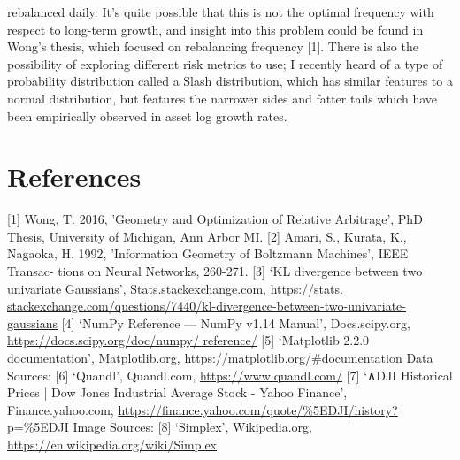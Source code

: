 \documentclass{article}
\begin{document}
rebalanced daily. It’s quite possible that this is not the optimal frequency with respect to long-term growth, and insight into this problem could be found in Wong’s thesis, which focused on rebalancing frequency [1].
There is also the possibility of exploring different risk metrics to use; I recently heard of a type of probability distribution called a Slash distribution, which has similar features to a normal distribution, but features the narrower sides and fatter tails which have been empirically observed in asset log growth rates.

\section*{References}
[1] Wong, T. 2016, ’Geometry and Optimization of Relative Arbitrage’, PhD Thesis, University of Michigan, Ann Arbor MI.
[2] Amari, S., Kurata, K., Nagaoka, H. 1992, ’Information Geometry of Boltzmann Machines’, IEEE Transac- tions on Neural Networks, 260-271.
[3] ‘KL divergence between two univariate Gaussians’, Stats.stackexchange.com, \url{https://stats. stackexchange.com/questions/7440/kl-divergence-between-two-univariate-gaussians}
[4] ‘NumPy Reference — NumPy v1.14 Manual’, Docs.scipy.org, \url{https://docs.scipy.org/doc/numpy/ reference/}
[5] ‘Matplotlib 2.2.0 documentation’, Matplotlib.org, \url{https://matplotlib.org/#documentation}
Data Sources:
[6] ‘Quandl’, Quandl.com, \url{https://www.quandl.com/}
[7] ‘∧DJI Historical Prices | Dow Jones Industrial Average Stock - Yahoo Finance’, Finance.yahoo.com, \url{https://finance.yahoo.com/quote/%5EDJI/history?p=%5EDJI}
Image Sources:
[8] ‘Simplex’, Wikipedia.org, \url{https://en.wikipedia.org/wiki/Simplex}
\end{document}
